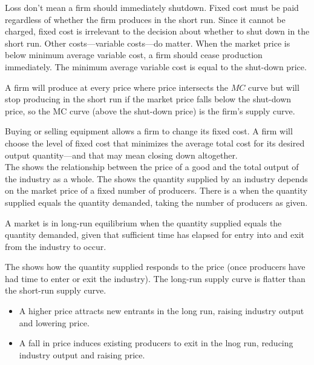\documentclass{article}
\begin{document}
Loss don't mean a firm should immediately shutdown. Fixed cost must be paid regardless of whether the firm produces in the short run. Since it cannot be charged, fixed cost is irrelevant to the decision about whether to shut down in the short run. Other costs---variable costs---do matter. When the market price is below minimum average variable cost, a firm should cease production immediately. The minimum average variable cost is equal to the shut-down price. 

\begin{remark}
  A firm will produce at every price where price intersects the $MC$ curve but will stop producing in the short run if the market price falls below the shut-down price, so the MC curve (above the shut-down price) is the firm's supply curve.
\end{remark}

Buying or selling equipment allows a firm to change its fixed cost. A firm will choose the level of fixed cost that minimizes the average total cost for its desired output quantity---and that may mean closing down altogether. \\ 

The  shows the relationship between the price of a good and the total output of the industry as a whole. The  shows the quantity supplied by an industry depends on the market price of a fixed number of producers. There is a  when the quantity supplied equals the quantity demanded, taking the number of producers as given. 

\begin{remark}
  A market is in long-run equilibrium when the quantity supplied equals the quantity demanded, given that sufficient time has elapsed for entry into and exit from the industry to occur. 
\end{remark}

The  shows how the quantity supplied responds to the price (once producers have had time to enter or exit the industry). The long-run supply curve is flatter than the short-run supply curve. 
\begin{itemize}
  \item A higher price attracts new entrants in the long run, raising industry output and lowering price.
  \item A fall in price induces existing producers to exit in the lnog run, reducing industry output and raising price.
\end{itemize}
\end{document}
